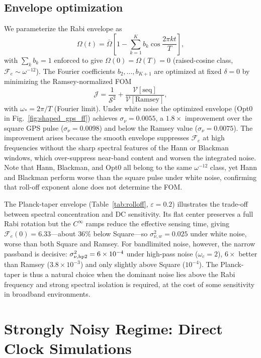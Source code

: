 \documentclass[aps,pra,twocolumn,superscriptaddress,longbibliography]{revtex4-2}
\newcommand{\be}{\begin{equation}}
\newcommand{\ee}{\end{equation}}
\begin{document}
\subsection{Envelope optimization}
\label{sec:envelope_opt}

We parameterize the Rabi envelope as
\be
  \Omega(t) = \bar\Omega\!\left[1 - \sum_{k=1}^K b_k\cos\!\frac{2\pi k t}{T}\right],
  \label{eq:rabi_param}
\ee
with $\sum_k b_k = 1$ enforced to give $\Omega(0)=\Omega(T)=0$ (raised-cosine class,
$\mathcal{F}_e\sim\omega^{-12}$).
The Fourier coefficients $b_2,\ldots,b_{K+1}$ are optimized at fixed $\delta=0$
by minimizing the Ramsey-normalized FOM
\be
  \mathcal{J} = \frac{1}{\mathcal{S}^2}
    + \frac{\mathcal{V}[\text{seq}]}{\mathcal{V}[\text{Ramsey}]},
  \label{eq:rn_obj}
\ee
with $\omega_* = 2\pi/T$ (Fourier limit).
Under white noise the optimized envelope (Opt0 in Fig.~\ref{fig:shaped_gps_ff})
achieves $\sigma_\nu = 0.0055$, a $1.8\times$ improvement over the square GPS pulse
($\sigma_\nu = 0.0098$) and below the Ramsey value ($\sigma_\nu = 0.0075$).
The improvement arises because the smooth envelope suppresses
$\mathcal{F}_e$ at high frequencies without the sharp spectral features of the
Hann or Blackman windows, which over-suppress near-band content and worsen the
integrated noise.
Note that Hann, Blackman, and Opt0 all belong to the same $\omega^{-12}$ class,
yet Hann and Blackman perform worse than the square pulse under white noise,
confirming that roll-off exponent alone does not determine the FOM.

The Planck-taper envelope (Table~\ref{tab:rolloff}, $\varepsilon=0.2$) illustrates
the trade-off between spectral concentration and DC sensitivity.
Its flat center preserves a full Rabi rotation but the $C^\infty$ ramps reduce the
effective sensing time, giving $\mathcal{F}_e(0)=6.33$---about $36\%$ below Square---so
$\sigma^2_{\nu,w}=0.025$ under white noise, worse than both Square and Ramsey.
For bandlimited noise, however, the narrow passband is decisive:
$\sigma^2_{\nu,{\rm hp2}}=6\times10^{-4}$ under high-pass noise ($\omega_c=2$),
$6\times$ better than Ramsey ($3.8\times10^{-3}$) and only slightly above Square
($10^{-4}$).
The Planck-taper is thus a natural choice when the dominant noise lies above the
Rabi frequency and strong spectral isolation is required, at the cost of some
sensitivity in broadband environments.


\section{Strongly Noisy Regime: Direct Clock Simulations}
\label{sec:strong_noise}
\end{document}
